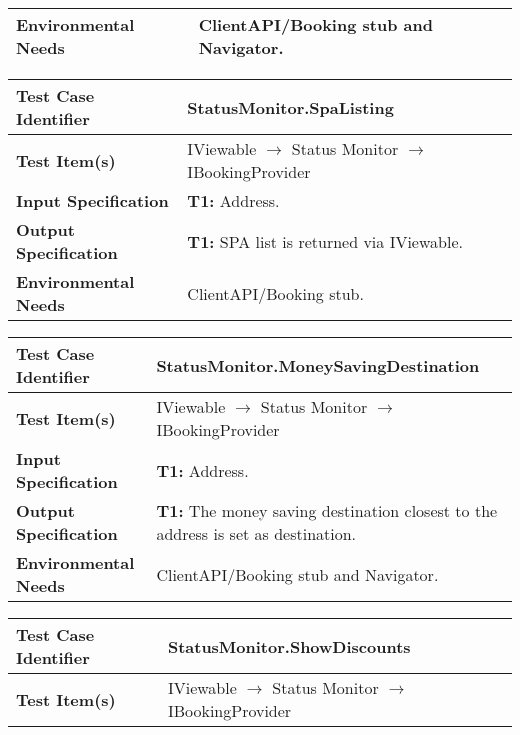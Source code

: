 {\begin{tabularx}{\textwidth}{l X}
    \textbf{Environmental Needs} & ClientAPI/Booking stub and Navigator.\\
    \hline
\end{tabularx}
\bigskip 

\noindent
\begin{tabularx}{\textwidth}{l X}
    \hline 
    \textbf{Test Case Identifier} & StatusMonitor.SpaListing\\ 
    \hline 
    
    \textbf{Test Item(s)} & IViewable $\rightarrow$ Status Monitor $\rightarrow$ IBookingProvider\\
    \hline 
    
    \textbf{Input Specification} & \textbf{T1:} Address.\\
    \hline 
    
    \textbf{Output Specification} & \textbf{T1:} SPA list is returned via IViewable. \\
    \hline 
    
    \textbf{Environmental Needs} & ClientAPI/Booking stub.\\
    \hline
\end{tabularx}
\bigskip 

\noindent
\begin{tabularx}{\textwidth}{l X}
    \hline 
    \textbf{Test Case Identifier} & StatusMonitor.MoneySavingDestination\\ 
    \hline 
    
    \textbf{Test Item(s)} & IViewable $\rightarrow$ Status Monitor $\rightarrow$ IBookingProvider\\
    \hline 
    
    \textbf{Input Specification} & \textbf{T1:} Address.\\
    \hline 
    
    \textbf{Output Specification} & \textbf{T1:} The money saving destination closest to the address is set as destination.\\
    \hline 
    
    \textbf{Environmental Needs} & ClientAPI/Booking stub and Navigator.\\
    \hline
\end{tabularx}
\bigskip 


\noindent
\begin{tabularx}{\textwidth}{l X}
    \hline 
    \textbf{Test Case Identifier} & StatusMonitor.ShowDiscounts\\ 
    \hline 
    
    \textbf{Test Item(s)} & IViewable $\rightarrow$ Status Monitor $\rightarrow$ IBookingProvider\\
    \hline 
    

\end{tabularx}}
